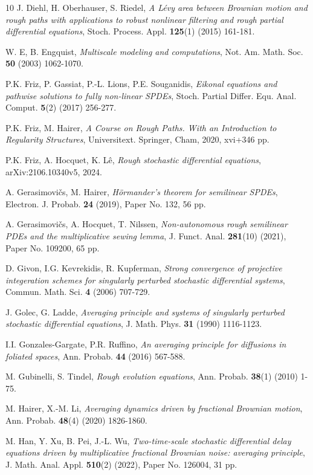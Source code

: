 \documentclass[10pt,a4paper]{article}
\numberwithin{equation}{section}
\begin{document}
\begin{thebibliography}{10}
 J. Diehl, H. Oberhauser, S. Riedel, \emph{A L\'{e}vy area between Brownian motion and rough paths with applications to robust nonlinear filtering and rough partial differential equations}, Stoch. Process. Appl. {\bf 125}(1) (2015) 161-181.


 W. E, B. Engquist, \emph{Multiscale modeling and computations}, Not. Am. Math. Soc. {\bf 50} (2003) 1062-1070.


 P.K. Friz, P. Gassiat, P.-L. Lions, P.E. Souganidis, \emph{Eikonal equations and pathwise solutions to fully non-linear SPDEs}, Stoch. Partial Differ. Equ. Anal. Comput. {\bf 5}(2) (2017) 256-277.


 P.K. Friz, M. Hairer, \emph{A Course on Rough Paths. With an Introduction to Regularity Structures}, Universitext. Springer, Cham, 2020, xvi+346 pp.

 P.K. Friz, A. Hocquet, K. L\^{e}, \emph{Rough stochastic differential equations}, arXiv:2106.10340v5, 2024.


 A. Gerasimovi\v{c}s, M. Hairer, \emph{H\"{o}rmander's theorem for semilinear SPDEs}, Electron. J. Probab. {\bf 24} (2019), Paper No. 132, 56 pp.


 A. Gerasimovi\v{c}s, A. Hocquet, T. Nilssen, \emph{Non-autonomous rough semilinear PDEs and the multiplicative sewing lemma}, J. Funct. Anal. {\bf 281}(10) (2021), Paper No. 109200, 65 pp.


 D. Givon, I.G. Kevrekidis, R. Kupferman, \emph{Strong convergence of projective integeration schemes for singularly perturbed stochastic differential systems}, Commun. Math. Sci. {\bf 4} (2006) 707-729.


 J. Golec, G. Ladde, \emph{Averaging principle and systems of singularly perturbed stochastic differential equations}, J. Math. Phys. {\bf 31} (1990) 1116-1123.


 I.I. Gonzales-Gargate, P.R. Ruffino, \emph{An averaging principle for diffusions in foliated spaces}, Ann. Probab. {\bf 44} (2016) 567-588.


 M. Gubinelli, S. Tindel,  \emph{Rough evolution equations}, Ann. Probab. {\bf 38}(1) (2010) 1-75.


 M. Hairer, X.-M. Li, \emph{Averaging dynamics driven by fractional Brownian motion}, Ann. Probab. {\bf 48}(4) (2020) 1826-1860.


 M. Han, Y. Xu, B. Pei, J.-L. Wu, \emph{Two-time-scale stochastic differential delay equations driven by multiplicative fractional Brownian noise: averaging principle}, J. Math. Anal. Appl. {\bf 510}(2) (2022), Paper No. 126004, 31 pp.



\end{thebibliography}
\end{document}
